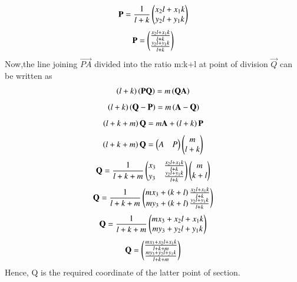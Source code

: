 \documentclass[journal,12pt,twocolumn]{IEEEtran}
\begin{document}
\begin{align}
     \mathbf{P}=\frac{1}{l+k}\begin{pmatrix}x_2l+x_1k\\y_2l+y_1k\end{pmatrix}
\end{align}
\begin{align}
     \mathbf{P}=\begin{pmatrix}\frac{x_2l+x_1k}{l+k}\\\frac{y_2l+y_1k}{l+k}\end{pmatrix}
\end{align}
Now,the line joining $\vec{PA}$ divided into the ratio m:k+l at point of division $\vec{Q}$ can be written as
\begin{align}
    \left(l+k\right)\left(\mathbf{PQ}\right)=m\left(\mathbf{QA}\right)
\end{align}
\begin{align}
    \left(l+k\right)\left(\mathbf{Q-P}\right)=m\left(\mathbf{A-Q}\right)
\end{align}
\begin{align}
    \left(l+k+m\right)\mathbf{Q}=m\mathbf{A}+\left(l+k\right)\mathbf{P}
\end{align}
\begin{align}
    \left(l+k+m\right)\mathbf{Q}=\begin{pmatrix}A & P\end{pmatrix}\begin{pmatrix}m\\l+k\end{pmatrix}
\end{align}
\begin{align}
    \mathbf{Q}=\frac{1}{l+k+m}\begin{pmatrix}x_3&\frac{x_2l+x_1k}{l+k}\\y_3&\frac{y_2l+y_1k}{l+k}\end{pmatrix}\begin{pmatrix}m\\k+l\end{pmatrix}
\end{align}
\begin{align}
    \mathbf{Q}=\frac{1}{l+k+m}\begin{pmatrix}mx_3+\left(k+l\right)\frac{x_2l+x_1k}{l+k}\\my_3+\left(k+l\right)\frac{y_2l+y_1k}{l+k}\end{pmatrix}
\end{align}
\begin{align}
    \mathbf{Q}=\frac{1}{l+k+m}\begin{pmatrix}mx_3+x_2l+x_1k\\my_3+y_2l+y_1k\end{pmatrix}
\end{align}
\begin{align}
    \mathbf{Q}=\begin{pmatrix}\frac{mx_3+x_2l+x_1k}{l+k+m}\\\frac{my_3+y_2l+y_1k}{l+k+m}\end{pmatrix}
\end{align}
Hence, Q is the required coordinate of the latter point of section.
\end{document}
